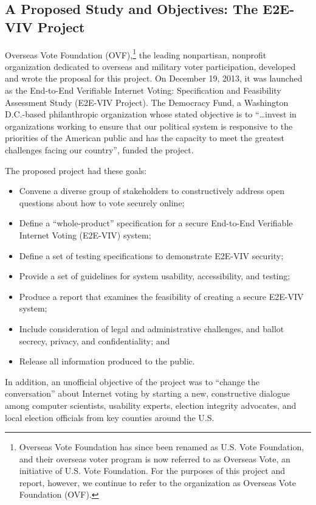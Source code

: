 \subsection{A Proposed Study and Objectives: The E2E-VIV Project}
\label{sec:proposed-study-and-objectives}

Overseas Vote Foundation (OVF),\footnote{Overseas Vote Foundation has
  since been renamed as U.S. Vote Foundation, and their overseas voter
  program is now referred to as Overseas Vote, an initiative of
  U.S. Vote Foundation. For the purposes of this project and report,
  however, we continue to refer to the organization as Overseas Vote
  Foundation (OVF).} the leading nonpartisan, nonprofit organization
dedicated to overseas and military voter participation, developed and
wrote the proposal for this project. On December 19, 2013, it was
launched as the End-to-End Verifiable Internet Voting: Specification
and Feasibility Assessment Study (E2E-VIV Project). The Democracy
Fund, a Washington D.C.-based philanthropic organization whose stated
objective is to ``…invest in organizations working to ensure that our
political system is responsive to the priorities of the American
public and has the capacity to meet the greatest challenges facing our
country'', funded the project.

The proposed project had these goals:
\begin{itemize}
\item Convene a diverse group of stakeholders to constructively
  address open questions about how to vote securely online;
\item Define a ``whole-product'' specification for a secure End-to-End
  Verifiable Internet Voting (E2E-VIV) system;
\item Define a set of testing specifications to demonstrate E2E-VIV
  security;
\item Provide a set of guidelines for system usability, accessibility, and testing; 
\item Produce a report that examines the feasibility of creating a
  secure E2E-VIV system;
\item Include consideration of legal and administrative challenges,
  and ballot secrecy, privacy, and confidentiality; and
\item Release all information produced to the public. 
\end{itemize}

In addition, an unofficial objective of the project was to ``change
the conversation'' about Internet voting by starting a new,
constructive dialogue among computer scientists, usability experts,
election integrity advocates, and local election officials from key
counties around the U.S.

